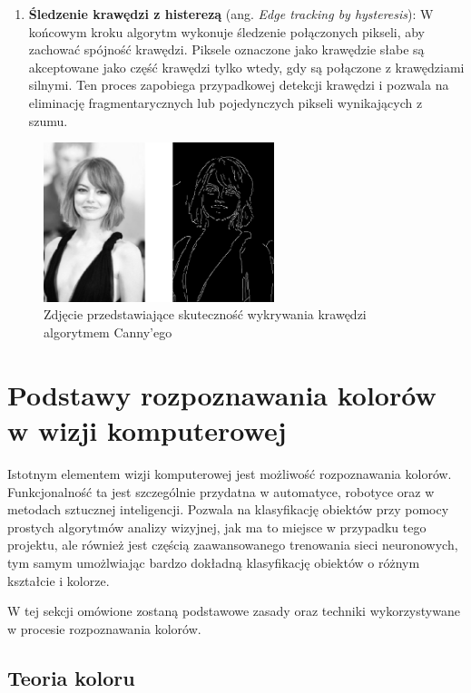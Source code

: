 \begin{enumerate}
    \item \textbf{Śledzenie krawędzi z histerezą} (ang. \textit{Edge tracking by hysteresis}): W końcowym kroku algorytm wykonuje śledzenie połączonych pikseli, aby zachować spójność krawędzi. Piksele oznaczone jako krawędzie słabe są akceptowane jako część krawędzi tylko wtedy, gdy są połączone z krawędziami silnymi. Ten proces zapobiega przypadkowej detekcji krawędzi i pozwala na eliminację fragmentarycznych lub pojedynczych pikseli wynikających z szumu.
\end{enumerate}


\begin{figure}[h!]
    \centering
    \includegraphics[width=0.6\textwidth]{./graf/canny-edge.png}
    \caption{Zdjęcie przedstawiające skuteczność wykrywania krawędzi algorytmem Canny'ego}
\end{figure}

\clearpage

\section{Podstawy rozpoznawania kolorów w wizji komputerowej}

Istotnym elementem wizji komputerowej jest możliwość rozpoznawania kolorów. Funkcjonalność ta jest szczególnie przydatna w automatyce, robotyce oraz w metodach sztucznej inteligencji. Pozwala na klasyfikację obiektów przy pomocy prostych algorytmów analizy wizyjnej, jak ma to miejsce w przypadku tego projektu, ale również jest częścią zaawansowanego trenowania sieci neuronowych, tym samym umożlwiając bardzo dokładną klasyfikację obiektów o różnym kształcie i kolorze. 

W tej sekcji omówione zostaną podstawowe zasady oraz techniki wykorzystywane w procesie rozpoznawania kolorów.


\subsection{Teoria koloru}

